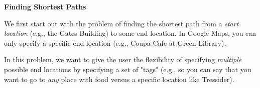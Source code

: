 \item {\bf Finding Shortest Paths}

We first start out with the problem of finding the shortest path from a \textit{start location} (e.g., the Gates Building) to some end location. In Google Maps, you can only specify a specific end location (e.g., Coupa Cafe at Green Library).
  
In this problem, we want to give the user the flexibility of specifying \textit{multiple} possible end locations by specifying a set of "tags" (e.g., so you can say that you want to go to \textit{any} place with food versus a specific location like Tressider).

\begin{enumerate}

  

  

  

\end{enumerate}
